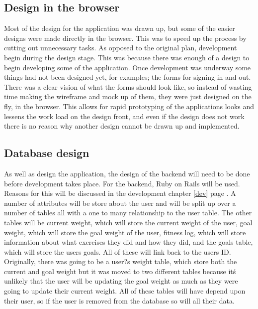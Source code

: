 \subsection{Design in the browser}
Most of the design for the application was drawn up, but some of the easier designs were made directly in the browser. This was to speed up the process by cutting out unnecessary tasks. As opposed to the original plan, development begin during the design stage. This was because there was enough of a design to begin developing some of the application. Once development was underway some things had not been designed yet, for examples; the forms for signing in and out. There was a clear vision of what the forms should look like, so instead of wasting time making the wireframe and mock up of them, they were just designed on the fly, in the browser. This allows for rapid prototyping of the applications looks and lessens the work load on the design front, and even if the design does not work there is no reason why another design cannot be drawn up and implemented.\\

\subsection{Database design}
As well as design the application, the design of the backend will need to be done before development takes place. For the backend, Ruby on Rails \citep{rails:2013} will be used. Reasons for this will be discussed in the development chapter \ref{dev} page \pageref{dev}. A number of attributes will be store about the user and will be split up over a number of tables all with a one to many relationship to the user table. The other tables will be current weight, which will store the current weight of the user, goal weight, which will store the goal weight of the user, fitness log, which will store information about what exercises they did and how they did, and the goals table, which will store the users goals. All of these will link back to the users ID. Originally, there was going to be a user?s weight table, which store both the current and goal weight but it was moved to two different tables because it\'s unlikely that the user will be updating the goal weight as much as they were going to update their current weight. All of these tables will have depend upon their user, so if the user is removed from the database so will all their data. 